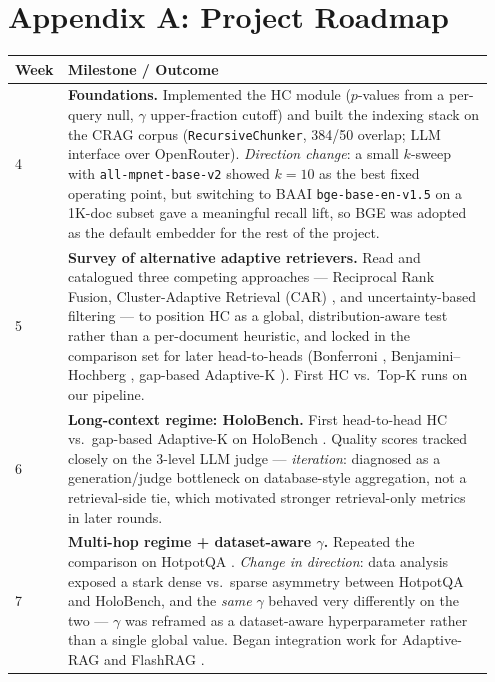 \documentclass[letterpaper]{article}
\begin{document}
\section*{Appendix A: Project Roadmap}

\begin{center}
\small
\begin{tabular}{p{0.07\linewidth}p{0.88\linewidth}}
\hline
Week & Milestone / Outcome \\
\hline
4   & \textbf{Foundations.} Implemented the HC module
($p$-values from a per-query null, $\gamma$ upper-fraction cutoff)
and built the indexing stack on the CRAG \cite{crag2024} corpus
(\texttt{RecursiveChunker}, 384/50 overlap; LLM interface over
OpenRouter). \emph{Direction change}: a small $k$-sweep with
\texttt{all-mpnet-base-v2} showed $k{=}10$ as the best fixed
operating point, but switching to BAAI \texttt{bge-base-en-v1.5}
\cite{bgeembeddings2023} on a 1K-doc subset gave a meaningful
recall lift, so BGE was adopted as the default embedder for the
rest of the project. \\
5   & \textbf{Survey of alternative adaptive retrievers.} Read and
catalogued three competing approaches --- Reciprocal Rank Fusion,
Cluster-Adaptive Retrieval (CAR) \cite{xu2025car}, and
uncertainty-based filtering --- to position HC as a global,
distribution-aware test rather than a per-document heuristic, and
locked in the comparison set for later head-to-heads (Bonferroni
\cite{bonferroni1961dunn}, Benjamini--Hochberg
\cite{benjamini1995fdr}, gap-based Adaptive-K
\cite{adaptivek2025}). First HC vs.\ Top-K runs on our pipeline. \\
6   & \textbf{Long-context regime: HoloBench.} First head-to-head
HC vs.\ gap-based Adaptive-K on HoloBench
\cite{maekawa2024holobench}. Quality scores tracked closely on the
3-level LLM judge --- \emph{iteration}: diagnosed as a
generation/judge bottleneck on database-style aggregation, not a
retrieval-side tie, which motivated stronger retrieval-only metrics
in later rounds. \\
7   & \textbf{Multi-hop regime + dataset-aware $\gamma$.} Repeated
the comparison on HotpotQA \cite{yang2018hotpotqa}. \emph{Change in
direction}: data analysis exposed a stark dense vs.\ sparse
asymmetry between HotpotQA and HoloBench, and the \emph{same}
$\gamma$ behaved very differently on the two ---
$\gamma$ was reframed as a dataset-aware hyperparameter rather than
a single global value. Began integration work for Adaptive-RAG
\cite{jeong2024adaptiverag} and FlashRAG \cite{jin2025flashrag}. \\

\end{tabular}
\end{center}
\end{document}

